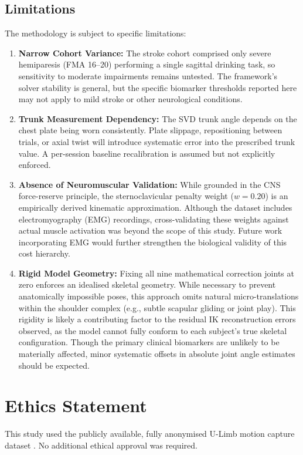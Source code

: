 \documentclass[12pt, a4paper]{elsarticle}
\begin{document}
\subsection{Limitations}
\label{sec:limitations}
The methodology is subject to specific limitations:
\begin{enumerate}
    \item \textbf{Narrow Cohort Variance:} The stroke cohort comprised only severe hemiparesis (FMA 16–20) performing a single sagittal drinking task, so sensitivity to moderate impairments remains untested. The framework's solver stability is general, but the specific biomarker thresholds reported here may not apply to mild stroke or other neurological conditions.
    \item \textbf{Trunk Measurement Dependency:} The SVD trunk angle depends on the chest plate being worn consistently. Plate slippage, repositioning between trials, or axial twist will introduce systematic error into the prescribed trunk value. A per-session baseline recalibration is assumed but not explicitly enforced.
    \item \textbf{Absence of Neuromuscular Validation:} While grounded in the CNS force-reserve principle, the sternoclavicular penalty weight ($w = 0.20$) is an empirically derived kinematic approximation. Although the dataset includes electromyography (EMG) recordings, cross-validating these weights against actual muscle activation was beyond the scope of this study. Future work incorporating EMG would further strengthen the biological validity of this cost hierarchy.
    \item \textbf{Rigid Model Geometry:} Fixing all nine mathematical correction joints at zero enforces an idealised skeletal geometry. While necessary to prevent anatomically impossible poses, this approach omits natural micro-translations within the shoulder complex (e.g., subtle scapular gliding or joint play). This rigidity is likely a contributing factor to the residual IK reconstruction errors observed, as the model cannot fully conform to each subject's true skeletal configuration. Though the primary clinical biomarkers are unlikely to be materially affected, minor systematic offsets in absolute joint angle estimates should be expected.
\end{enumerate}

\section*{Ethics Statement}
This study used the publicly available, fully anonymised U-Limb motion capture dataset \cite{averta2021ulimb}. No additional ethical approval was required.
\end{document}
